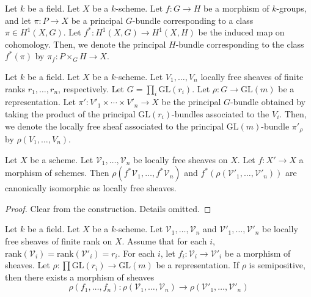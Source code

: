 \begin{definition}
Let $k$ be a field.
Let $X$ be a $k$-scheme.
Let $f:G\to H$ be a morphism of $k$-groups, and let $\pi:P\to X$ be a principal $G$-bundle corresponding to a class $\pi\in H^1(X,G)$. 
Let $f^{*}:H^1(X,G)\to H^1(X,H)$ be the induced map on cohomology. 
Then, we denote the principal $H$-bundle corresponding to the class $f^{*}(\pi)$ by $\pi_f:P\times_{G}H\to X$.
\end{definition}

\begin{definition}
Let $k$ be a field.
Let $X$ be a $k$-scheme. 
Let $V_1,\ldots,V_n$ locally free sheaves of finite ranks $r_1,\dots, r_n$, respectively.
Let $G=\prod_i \mathrm{GL}(r_i)$.
Let $\rho:G\rightarrow \mathrm{GL}(m)$ be a representation. 
Let $\pi':V'_1\times\cdots\times V'_n\to X$ be the principal $G$-bundle obtained by taking the product of the principal $\mathrm{GL}(r_i)$-bundles associated to the $V_i$.
Then, we denote the locally free sheaf associated to the principal $\mathrm{GL}(m)$-bundle $\pi'_{\rho}$ by $\rho(V_1,\dots, V_n)$.
\end{definition}

\begin{lemma}\label{pullback_and_rho_commute}
Let $X$ be a scheme.
Let $\mathcal{V}_1,\ldots,\mathcal{V}_n$ be locally free sheaves on $X$. Let $f:X'\rightarrow X$ a morphism of schemes.
Then $\rho(f^*\mathcal{V}_1,\dots,f^*\mathcal{V}_n)$ and $f^*(\rho(\mathcal{V}'_1,\dots,\mathcal{V}'_n))$ are canonically isomorphic as locally free sheaves.
\end{lemma}

\begin{proof}
Clear from the construction. Details omitted.
\end{proof}


\begin{lemma}\label{functoriality_rho}
Let $k$ be a field.
Let $X$ be a $k$-scheme.
Let $\mathcal{V}_1,\dots, \mathcal{V}_n$ and $\mathcal{V}'_1,\dots,\mathcal{V}'_n$ be locally free sheaves of finite rank on $X$.
Assume that for each $i$, $\mathrm{rank}(\mathcal{V}_i)=\mathrm{rank}(\mathcal{V}'_i)=r_i$.
For each $i$, let $f_i:\mathcal{V}_i\rightarrow \mathcal{V}'_i$ be a morphism of sheaves.
Let $\rho:\prod\mathrm{GL}(r_i)\to\mathrm{GL}(m)$ be a representation.
If $\rho$ is semipositive, then there exists a morphism of sheaves
$$
\rho(f_1,\dots, f_n):\rho(\mathcal{V}_1,\ldots,\mathcal{V}_n)\rightarrow \rho(\mathcal{V}'_1,\dots,\mathcal{V}'_n)
$$
\end{lemma}

